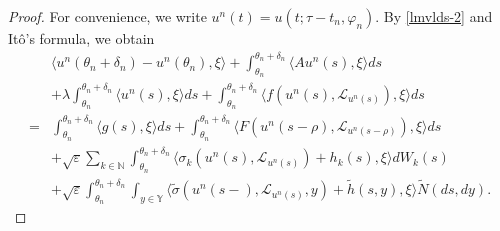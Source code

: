 \documentclass[11pt]{article}
\numberwithin{equation}{section}
\theoremstyle{plain}
\begin{document}
\begin{proof}
 
  
     

   For convenience, we write
   $u^n (t) = u(t; \tau -t_n, \varphi_n)$. 
By
  \eqref{lmvlds-2} and It\^o's formula, we obtain
 \begin{align} \label{pac-9}
       & \langle u^n( \theta_n + \delta_n )
                       - u^n(\theta_n), 
                       \xi
           \rangle
           + \int_{\theta_n}^{\theta_n + \delta_n} 
                   \langle A u^n(s), \xi \rangle ds  \nonumber\\
       & + \lambda 
                  \int_{\theta_n}^{\theta_n + \delta_n} 
                     \langle u^n(s), \xi \rangle ds
           + \int_{\theta_n}^{\theta_n + \delta_n} 
                   \langle f(u^n(s), \mathcal{L}_{u^n(s)}), 
                               \xi 
                   \rangle ds  \nonumber \\
   = & \int_{\theta_n}^{\theta_n + \delta_n} 
                 \langle g(s), \xi \rangle ds
           + \int_{\theta_n}^{\theta_n + \delta_n} 
                 \langle F(u^n(s-\rho), \mathcal{L}_{u^n(s-\rho)}), 
                              \xi 
                 \rangle ds  \nonumber \\
       & + \sqrt{\varepsilon} \sum_{k \in \mathbb{N} } 
                   \int_{\theta_n}^{\theta_n + \delta_n} 
                        \langle \sigma_k(u^n(s), \mathcal{L}_{u^n(s)}) + h_k(s),
                                     \xi
                        \rangle dW_k(s)  \nonumber \\
       & + \sqrt{\varepsilon} 
                   \int_{\theta_n}^{\theta_n + \delta_n} 
                        \int_{y \in \mathbb{Y} }
                            \langle
                                        \widetilde{\sigma}(u^n(s-), \mathcal{L}_{u^n(s)}, y) 
                                        +  \widetilde{h}(s, y), 
                                        \xi 
                            \rangle
                       \widetilde{N}(ds, dy).
 \end{align}
 

\end{proof}
\end{document}
